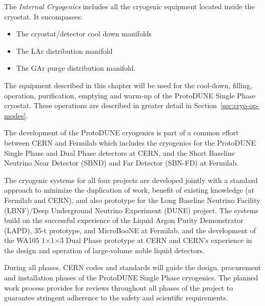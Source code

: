 %
The \textit{Internal Cryogenics} includes all the cryogenic equipment located inside the cryostat. It encompasses:
%
\begin{itemize}
\item The cryostat/detector cool down manifolds
\item The LAr distribution manifold
\item The GAr purge distribution manifold.
\end{itemize}
%
The equipment described in this chapter will be used for the cool-down, filling, operation, purification, emptying and warm-up of the ProtoDUNE Single Phase cryostat. These operations are described in greater detail in Section~\ref{sec:cryo-op-modes}.

The development of the ProtoDUNE cryogenics is part of a common effort between CERN and Fermilab which includes the cryogenics for the ProtoDUNE Single Phase and Dual Phase detectors at CERN, and the Short Baseline Neutrino Near Detector (SBND) and Far Detector (SBN-FD) at Fermilab.

The cryogenic systems for all four projects are developed jointly with a standard approach to minimize the duplication of work, benefit of existing knowledge (at Fermilab and CERN), and also prototype for the Long Baseline Neutrino Facility (LBNF)/Deep Underground Neutrino Experiment (DUNE) project. The systems build on the successful experience of the Liquid Argon Purity Demonstrator (LAPD), 35-t prototype, and MicroBooNE at Fermilab, and the development of the WA105 1$\times$1$\times$3 Dual Phase prototype at CERN and CERN's experience in the design and operation of large-volume noble liquid detectors.


During all phases, CERN codes and standards will guide the design, procurement and installation phases of the ProtoDUNE Single Phase cryogenics. The planned work process provides for reviews throughout all phases of the project to guarantee stringent adherence to the safety and scientific requirements.

